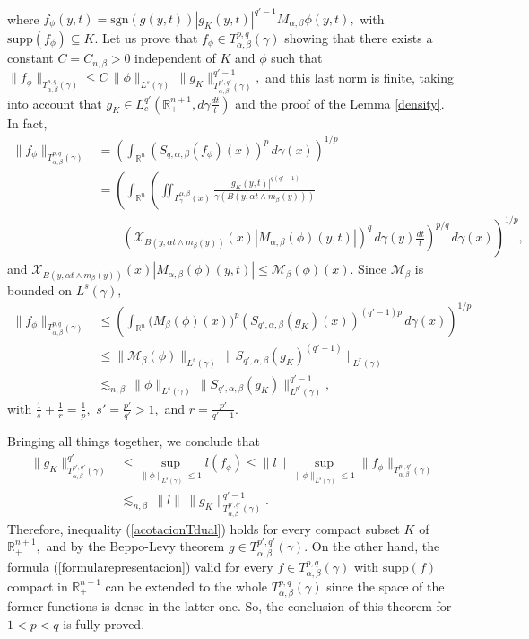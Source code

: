 \documentclass[leqno,11pt]{amsart}
\theoremstyle{plain}
\theoremstyle{remark}
\begin{document}
{\begin{align*}
 \end{align*}
 where $f_\phi(y,t)=\mathrm{sgn}(g(y,t)) |g_K(y,t)|^{q'-1}M_{\alpha,\beta}\phi(y,t),$ with $\text{supp}(f_\phi)\subseteq K.$ Let us prove that $f_\phi\in T^{p,q}_{\alpha, \beta}(\gamma)$ showing that there exists a constant $C=C_{n,\beta}>0$ independent of $K$ and $\phi$ such that $\|f_\phi\|_{T^{p,q}_{\alpha, \beta}(\gamma)}\le C\, \|\phi\|_{L^s(\gamma)}\, \|g_K\|_{T^{p',q'}_{\alpha, \beta}(\gamma)}^{q'-1},$ and this last norm is finite, taking into account that $g_K\in L^{q'}_c(\mathbb{R}^{n+1}_+,d\gamma\frac{dt}{t})$ and the proof of the Lemma \ref{density}. 
In fact,
\begin{align*}
\|f_\phi\|_{T^{p,q}_{\alpha, \beta}(\gamma)} &=\left(\int_{\mathbb{R}^n}(S_{q,\alpha,\beta}(f_\phi)(x))^p\, d\gamma(x)\right)^{1/p}\\ &=\left(\int_{\mathbb{R}^n}\left(\iint_{\Gamma^{\alpha, \beta}_\gamma(x)}\frac{|g_K(y,t)|^{q(q'-1)}}{\gamma(B(y, \alpha t\wedge m_\beta(y)))}\, \right. \right.\\ &\left. \qquad \left. (\mathcal{X}_{B(y,\alpha t\wedge m_\beta(y))}(x) |M_{\alpha, \beta}(\phi)(y,t)|)^q\, d\gamma(y)\frac{dt}{t}\right)^{p/q}\, d\gamma(x)\right)^{1/p},
\end{align*}
 and $\mathcal{X}_{B(y, \alpha t\wedge m_\beta(y))}(x)|M_{\alpha, \beta}(\phi)(y,t)|\le \mathcal{M}_\beta(\phi)(x)$. Since $\mathcal{M}_\beta$ is bounded on $L^s (\gamma),$
  \begin{align*}
\|f_\phi\|_{T^{p,q}_{\alpha, \beta}(\gamma)}&\le \left(\int_{\mathbb{R}^n}\mathcal({M}_\beta(\phi)(x))^p (S_{q',\alpha, \beta}(g_K)(x))^{(q'-1)p}\, d\gamma(x)\right)^{1/p}\\ &\le \|\mathcal{M}_\beta(\phi)\|_{L^s(\gamma)}\, \|S_{q',\alpha,\beta}(g_K)^{(q'-1)}\|_{L^r(\gamma)}\\
&\lesssim_{n,\beta}\, \|\phi\|_{L^s(\gamma)}\, \|S_{q',\alpha, \beta}(g_K)\|_{L^{p'}(\gamma)}^{q'-1},
 \end{align*}
 with $\frac{1}{s}+\frac{1}{r}=\frac{1}{p},$ $s'=\frac{p'}{q'}>1,$ and $r=\frac{p'}{q'-1}.$ 
 
 
 

 
 Bringing all things together, we conclude that
 \begin{align*}\|g_K\|^{q'}_{T^{p',q'}_{\alpha, \beta}(\gamma)} &\le \underset{\|\phi\|_{L^s(\gamma)}\le 1}{\sup}l(f_\phi)\le \|l\|
 \underset{\|\phi\|_{L^s(\gamma)}\le 1}{\sup}\|f_\phi\|_{T^{p',q'}_{\alpha, \beta}(\gamma)} \\
 &\lesssim_{n,\beta}\, \|l\|\, \|g_K\|_{T^{p',q'}_{\alpha, \beta}(\gamma)}^{q'-1}.\end{align*}
 Therefore, inequality (\ref{acotacionTdual}) holds for every compact subset $K$ of $\mathbb{R}^{n+1}_+,$ and by the Beppo-Levy theorem $g\in T^{p',q'}_{\alpha, \beta}(\gamma)$. On the other hand, the formula (\ref{formularepresentacion}) valid for every $f\in T^{p,q}_{\alpha, \beta}(\gamma)$ with $\text{supp}(f)$ compact in $\mathbb{R}^{n+1}_+$ can be extended to the whole $T^{p,q}_{\alpha, \beta}(\gamma)$ since the space of the former functions is dense in the latter one. So, the conclusion of this theorem for $1<p<q$ is fully proved.

}
\end{document}
